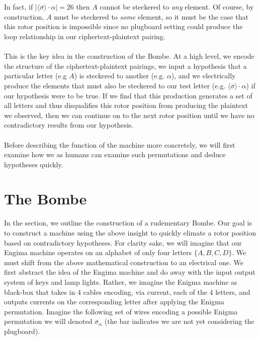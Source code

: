     \\\\In fact, if $|\langle\overline{\sigma}\rangle\cdot\alpha| = 26$
    then $A$ cannot be steckered to \emph{any} element. Of course, by construction, $A$ must be steckered to \emph{some} element, so it must be the case
    that this rotor position is impossible since no plugboard setting could produce the loop relationship in our ciphertext-plaintext pairing. 
    \\\\This is the 
    key idea in the construction of the Bombe. At a high level, we encode the structure of the ciphertext-plaintext pairings, we input a hypothesis that a particular 
    letter (e.g $A$) is steckered to another (e.g. $\alpha$), and we electrically produce the elements that must also be steckered to our test letter 
    (e.g. $\langle\overline{\sigma}\rangle\cdot\alpha$) if our hypothesis were to be true. If we find that this production generates a set of all letters and thus disqualifies this rotor position from producing
    the plaintext we observed, then we can continue on to the next rotor position until we have no contradictory results from our hypothesis.
    \\\\Before describing the function of the machine more concretely, we will first examine how we as humans can examine such permutations and deduce hypotheses quickly. 
    
    \section{The Bombe}

    In the section, we outline the construction of a rudementary Bombe. Our goal is to construct a machine using the above insight to quickly elimate a rotor position based on contradictory hypotheses. For clarity sake, we will 
    imagine that our Engima machine operates on an alphabet of only four letters $\{A, B, C, D\}$.  
    We must shift from the above mathematical construction to an electrical one. We first abstract the idea of the Engima machine and do away with the input output system of keys and lamp lights.
    Rather, we imagine the Enigma machine as black-box that takes in 4 cables encoding, via current, each of the 4 letters, and outputs currents on the corresponding letter after applying the Enigma permutation.
    Imagine the following set of wires encoding a possible Enigma permutation we will denoted $\overline\sigma_\alpha$ (the bar indicates we are not yet considering the plugboard).
    

